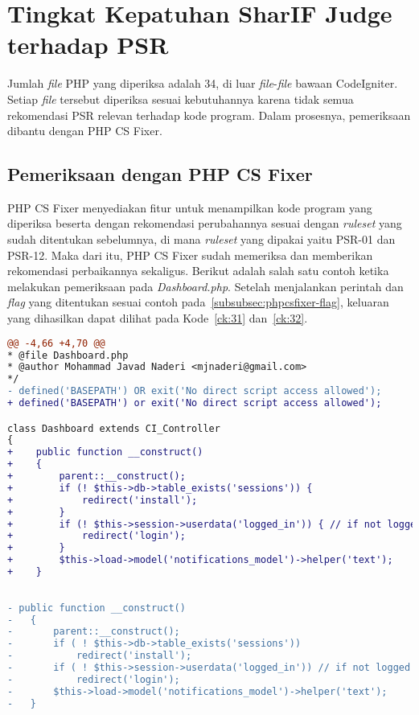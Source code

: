 \section{Tingkat Kepatuhan SharIF Judge terhadap PSR}
\label{sec:tingkat_patuh}
Jumlah \textit{file} PHP yang diperiksa adalah 34, di luar \textit{file}-\textit{file} bawaan CodeIgniter. Setiap \textit{file} tersebut diperiksa sesuai kebutuhannya karena tidak semua rekomendasi PSR relevan terhadap kode program. Dalam prosesnya, pemeriksaan dibantu dengan PHP CS Fixer. 

\subsection{Pemeriksaan dengan PHP CS Fixer}
\label{subsec:periksa_otomatis}
PHP CS Fixer menyediakan fitur untuk menampilkan kode program yang diperiksa beserta dengan rekomendasi perubahannya sesuai dengan \textit{ruleset} yang sudah ditentukan sebelumnya, di mana \textit{ruleset} yang dipakai yaitu PSR-01 dan PSR-12. Maka dari itu, PHP CS Fixer sudah memeriksa dan memberikan rekomendasi perbaikannya sekaligus. Berikut adalah salah satu contoh ketika melakukan pemeriksaan pada \textit{Dashboard.php}.  Setelah menjalankan perintah dan \textit{flag} yang ditentukan sesuai contoh pada~\ref{subsubsec:phpcsfixer-flag}, keluaran yang dihasilkan dapat dilihat pada Kode~\ref{ck:31} dan~\ref{ck:32}. 

\begin{lstlisting}[language=diff, basicstyle=\ttfamily, frame=single,
	columns=fullflexible, showtabs=true, keepspaces=true, breaklines=true, label=ck:31, caption=Contoh penggunaan PHP CS Fixer pada sebagian kode \textit{Dashboard.php} dengan mengaktifkan parameter \textit{showtabs} yang menampilkan jarak \textit{tab}]
@@ -4,66 +4,70 @@
* @file Dashboard.php
* @author Mohammad Javad Naderi <mjnaderi@gmail.com>
*/
- defined('BASEPATH') OR exit('No direct script access allowed');
+ defined('BASEPATH') or exit('No direct script access allowed');

class Dashboard extends CI_Controller
{
+    public function __construct()
+    {
+        parent::__construct();
+        if (! $this->db->table_exists('sessions')) {
+            redirect('install');
+        }
+        if (! $this->session->userdata('logged_in')) { // if not logged in
+            redirect('login');
+        }
+        $this->load->model('notifications_model')->helper('text');
+    }
	
	
- public function __construct()
-	{
-		parent::__construct();
-		if ( ! $this->db->table_exists('sessions'))
-			redirect('install');
-		if ( ! $this->session->userdata('logged_in')) // if not logged in
-			redirect('login');
-		$this->load->model('notifications_model')->helper('text');
-	}

\end{lstlisting}

